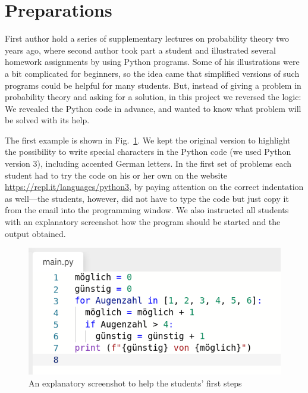 \documentclass[]{interact}
\theoremstyle{plain}%
\theoremstyle{definition}
\theoremstyle{remark}
\begin{document}
\section{Preparations}

First author hold a series of supplementary lectures on probability theory two years ago, where second author
took part a student and illustrated several homework assignments by using Python programs.
Some of his illustrations were a bit complicated for beginners, so the idea came that
simplified versions of such programs could be helpful for many students.
But, instead of giving a problem in probability theory and asking for a solution, in this
project we reversed the logic: We revealed the Python code in advance, and wanted to know
what problem will be solved with its help.

%

The first example is shown in Fig.~\ref{main-py-window}. We kept the original version to highlight
the possibility to write special characters in the Python code (we used Python version 3),
including accented German letters. In the first set of problems each student had to try
the code on his or her own on the website \url{https://repl.it/languages/python3},
by paying attention on the correct indentation as well---the students, however, did not have
to type the code but just copy it from the email into the programming window.
We also instructed all students with an
explanatory screenshot how the program should be started and the output obtained.

\begin{figure}
\begin{center}\includegraphics[scale=0.5]{../forms/de_AT/main-py-window}
\caption{An explanatory screenshot to help the students' first steps}
\label{main-py-window}
\end{center}
\end{figure}
\end{document}
